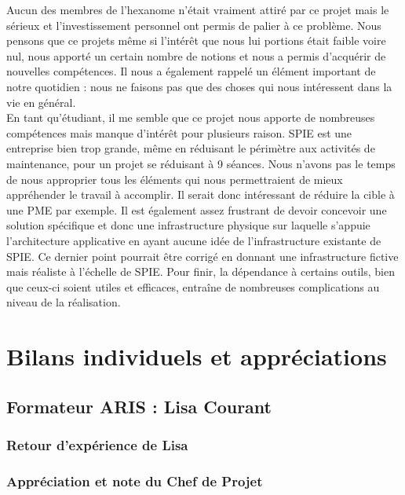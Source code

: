 Aucun des membres de l’hexanome n’était vraiment attiré par ce projet mais le sérieux et l’investissement personnel ont permis de palier à ce problème. Nous pensons que ce projets même si l’intérêt que nous lui portions était faible voire nul, nous apporté un certain nombre de notions et nous a permis d’acquérir de nouvelles compétences. Il nous a également rappelé un élément important de notre quotidien : nous ne faisons pas que des choses qui nous intéressent dans la vie en général. \\

En tant qu’étudiant, il me semble que ce projet nous apporte de nombreuses compétences mais manque d’intérêt pour plusieurs raison. SPIE est une entreprise bien trop grande, même en réduisant le périmètre aux activités de maintenance, pour un projet se réduisant à 9 séances. Nous n’avons pas le temps de nous approprier tous les éléments qui nous permettraient de mieux appréhender le travail à accomplir. Il serait donc intéressant de réduire la cible à une PME par exemple. Il est également assez frustrant de devoir concevoir une solution spécifique et donc une infrastructure physique sur laquelle s’appuie l’architecture applicative en ayant aucune idée de l’infrastructure existante de SPIE. Ce dernier point pourrait être corrigé en donnant une infrastructure fictive mais réaliste à l’échelle de SPIE. Pour finir, la dépendance à certains outils, bien que ceux-ci soient utiles et efficaces, entraîne de nombreuses complications au niveau de la réalisation.

\section{Bilans individuels et appréciations}

\subsection{Formateur ARIS : Lisa Courant}

\subsubsection{Retour d'expérience de Lisa}


\subsubsection{Appréciation et note du Chef de Projet}

